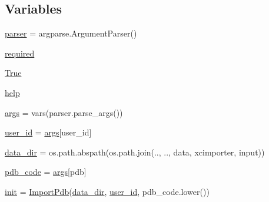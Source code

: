 \subsection*{Variables}
\begin{DoxyCompactItemize}
\item 
\hyperlink{namespacefragalysis__api_1_1xcimporter_1_1pdbimporter_a5b23293cbebeaca77c09ce42825f5193}{parser} = argparse.\+Argument\+Parser()
\item 
\hyperlink{namespacefragalysis__api_1_1xcimporter_1_1pdbimporter_a883e1e2ba2b22247199b8820ae5f9178}{required}
\item 
\hyperlink{namespacefragalysis__api_1_1xcimporter_1_1pdbimporter_aa4558e839590268b25cacf39bc287d43}{True}
\item 
\hyperlink{namespacefragalysis__api_1_1xcimporter_1_1pdbimporter_a149a72a87e486442ab858e40cec92690}{help}
\item 
\hyperlink{namespacefragalysis__api_1_1xcimporter_1_1pdbimporter_a98658023f7019ff38aa6fc1beb1be986}{args} = vars(parser.\+parse\+\_\+args())
\item 
\hyperlink{namespacefragalysis__api_1_1xcimporter_1_1pdbimporter_a9cee2acc4fc991cee1a09431247027f9}{user\+\_\+id} = \hyperlink{namespacefragalysis__api_1_1xcimporter_1_1pdbimporter_a98658023f7019ff38aa6fc1beb1be986}{args}\mbox{[}\textquotesingle{}user\+\_\+id\textquotesingle{}\mbox{]}
\item 
\hyperlink{namespacefragalysis__api_1_1xcimporter_1_1pdbimporter_a1bf97f08674fecb515e86341fcdbd853}{data\+\_\+dir} = os.\+path.\+abspath(os.\+path.\+join(\textquotesingle{}..\textquotesingle{}, \textquotesingle{}..\textquotesingle{}, \textquotesingle{}data\textquotesingle{}, \textquotesingle{}xcimporter\textquotesingle{}, \textquotesingle{}input\textquotesingle{}))
\item 
\hyperlink{namespacefragalysis__api_1_1xcimporter_1_1pdbimporter_a9610d6769273d7c05f68e92148450263}{pdb\+\_\+code} = \hyperlink{namespacefragalysis__api_1_1xcimporter_1_1pdbimporter_a98658023f7019ff38aa6fc1beb1be986}{args}\mbox{[}\textquotesingle{}pdb\textquotesingle{}\mbox{]}
\item 
\hyperlink{namespacefragalysis__api_1_1xcimporter_1_1pdbimporter_a3ad00a74050cce6bc31b2b0c736ba739}{init} = \hyperlink{classfragalysis__api_1_1xcimporter_1_1pdbimporter_1_1_import_pdb}{Import\+Pdb}(\hyperlink{namespacefragalysis__api_1_1xcimporter_1_1pdbimporter_a1bf97f08674fecb515e86341fcdbd853}{data\+\_\+dir}, \hyperlink{namespacefragalysis__api_1_1xcimporter_1_1pdbimporter_a9cee2acc4fc991cee1a09431247027f9}{user\+\_\+id}, pdb\+\_\+code.\+lower())
\end{DoxyCompactItemize}


